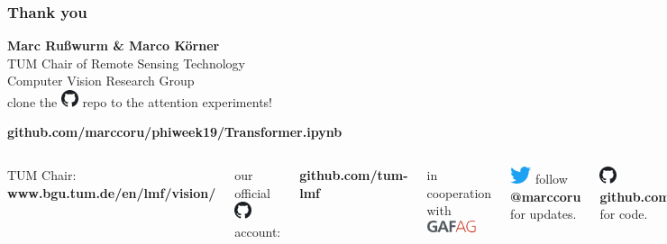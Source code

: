 \documentclass[%
  aspectratio=169,
  9pt,
  english,
  light,
  mathserif,
  professionalfont,
  affiliationintitlepagehead,
  titlegraphic,
   affiliation,
]{beamer}
\begin{document}
\begin{frame}
	\frametitle{Thank you}
	\vspace{-1em}
	{\Large\centering 
		\textbf{Marc Rußwurm \& Marco Körner} \\
	
		TUM Chair of Remote Sensing Technology \\
		
		\centering Computer Vision Research Group \\
	
	
	\vspace{1em}
	clone the \includegraphics[width=5mm]{images/github} repo to the attention experiments! 
	
	\centering\textbf{github.com/marccoru/phiweek19/Transformer.ipynb}
	
}

	\vspace{2em}
	\Large 
	\begin{columns}[t]
		TUM Chair: \textbf{www.bgu.tum.de/en/lmf/vision/}
	
		our official \includegraphics[width=5mm]{images/github} account: 
		
		{\textbf{github.com/tum-lmf}}
		
		\vspace{1em}
		
		in cooperation with \includegraphics[height=1em]{images/GAF_logo}
		
		
		\includegraphics[height=5mm]{images/twitter} follow \textbf{@marccoru} for updates.
		
		\vspace{1em}
		\includegraphics[height=5mm]{images/github} \textbf{github.com/marccoru} for code.
		
		\vspace{1em}
		and \textbf{marccoru.github.io}
		
	\end{columns}

	
	
\end{frame}



\end{document}
